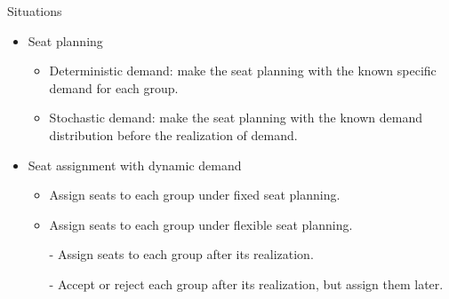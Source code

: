     \begin{frame}{Situations}
      \begin{itemize}
        \item Seat planning
        \vspace*{0.2cm}
        \begin{itemize}
          \item {\color{red}Deterministic demand}: make the seat planning with the known specific demand for each group.
          \item {\color{red}Stochastic demand}: make the seat planning with the known demand distribution before the realization of demand.
        \end{itemize}
        
        \item Seat assignment with dynamic demand
        
        \begin{itemize}
          \vspace*{0.2cm}
          \item Assign seats to each group under {\color{red}fixed} seat planning.
          \vspace*{0.2cm}
          \item Assign seats to each group under {\color{red}flexible} seat planning.
          \vspace*{0.2cm}
            \item[-] Assign seats to each group after its realization.
            \item[-] Accept or reject each group after its realization, but assign them later.
        \end{itemize}
      \end{itemize}
    \end{frame}